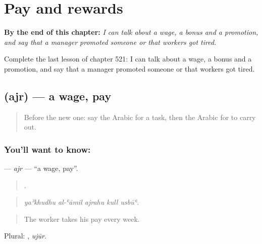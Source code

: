 
\chapter{Pay and rewards}
\label{ch:ar-pay-and-rewards}

\begin{chapteropening}
\textbf{By the end of this chapter:} \emph{I can talk about a wage, a bonus and a promotion, and say that a manager promoted someone or that workers got tired.}

Complete the last lesson of chapter 521: I can talk about a wage, a bonus and a promotion, and say that a manager promoted someone or that workers got tired.
\end{chapteropening}

\section[\texorpdfstring{\ar{أجر} (ajr)}{أجر (ajr)}]{ (ajr) — a wage, pay}

\label{lesson:AR-C521-ajr}



\begin{quote}
Before the new one: say the Arabic for a task, then the Arabic for to carry out.
\end{quote}

\subsection*{You'll want to know: }
\textbf{} — \emph{ajr} — \textquotedblleft{}a wage, pay\textquotedblright{}.

\begin{quote}
    .
\end{quote}

\begin{quote}
\emph{yaʾkhudhu al-ʿāmil ajrahu kull usbūʿ.}
\end{quote}

\begin{quote}
The worker takes his pay every week.
\end{quote}

Plural: , \emph{ujūr}.

